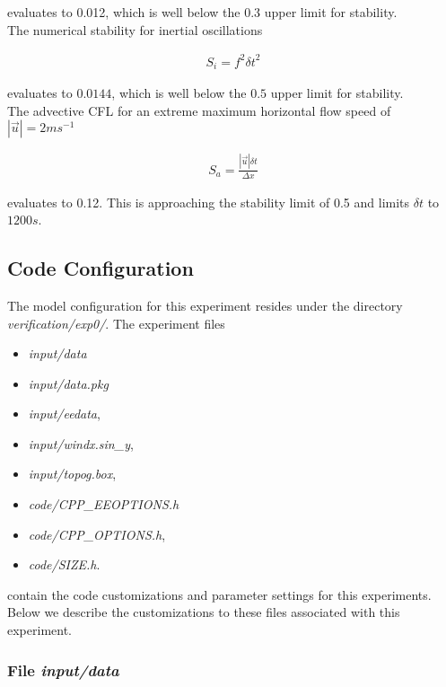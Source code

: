 \noindent evaluates to 0.012, which is well below the 0.3 upper limit
for stability. 
\\

\noindent The numerical stability for inertial oscillations  
\cite{adcroft:95} 

\begin{eqnarray}
\label{EQ:eg-baro-inertial_stability}
S_{i} = f^{2} {\delta t}^2
\end{eqnarray}

\noindent evaluates to $0.0144$, which is well below the $0.5$ upper 
limit for stability.
\\

\noindent The advective CFL \cite{adcroft:95} for an extreme maximum 
horizontal flow speed of $ | \vec{u} | = 2 ms^{-1}$

\begin{eqnarray}
\label{EQ:eg-baro-cfl_stability}
S_{a} = \frac{| \vec{u} | \delta t}{ \Delta x}
\end{eqnarray}

\noindent evaluates to 0.12. This is approaching the stability limit
of 0.5 and limits $\delta t$ to $1200s$.

\subsection{Code Configuration}
\label{www:tutorials}
\label{SEC:eg-baro-code_config}

The model configuration for this experiment resides under the 
directory {\it verification/exp0/}.  The experiment files 
\begin{itemize}
\item {\it input/data}
\item {\it input/data.pkg}
\item {\it input/eedata},
\item {\it input/windx.sin\_y},
\item {\it input/topog.box},
\item {\it code/CPP\_EEOPTIONS.h}
\item {\it code/CPP\_OPTIONS.h},
\item {\it code/SIZE.h}. 
\end{itemize}
contain the code customizations and parameter settings for this 
experiments. Below we describe the customizations
to these files associated with this experiment.

\subsubsection{File {\it input/data}}
\label{www:tutorials}

